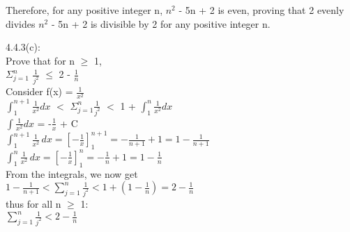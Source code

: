 \documentclass{article}
\begin{document}
	\newline
	Therefore, for any positive integer n, $n^2$ - 5n + 2 is even, proving that 2 evenly divides $n^2$ - 5n + 2 
	is divisible by 2 for any positive integer n. \\
	\newline
	\newline
	\newline
	\newline
	\newline
	\newline
	\newline
	\newline
	\newline
	\newline
	\newline
	\newline
	
	4.4.3(c): \\
	Prove that for n $\geq$ 1, \\
	$\Sigma^{n}_{j=1}$ $\frac{1}{j^2}$ $\leq$ 2 - $\frac{1}{n}$\\
	Consider f(x) = $\frac{1}{x^2}$ \\
	$\int_{1}^{n+1} \frac{1}{x^2} dx$ $<$ $\Sigma^{n}_{j=1} \frac{1}{j^2}$ $<$ 1 + $\int_{1}^{n} \frac{1}{x^2} dx$ \\
	$\int \frac{1}{x^2} dx$ = -$\frac{1}{x}$ + C \\
	$\int_{1}^{n+1} \frac{1}{x^2} \, dx = \left[ -\frac{1}{x} \right]_{1}^{n+1} = -\frac{1}{n+1} + 1 = 1 - \frac{1}{n+1}$ \\
	$\int_{1}^{n} \frac{1}{x^2} \, dx = \left[ -\frac{1}{x} \right]_{1}^{n} = -\frac{1}{n} + 1 = 1 - \frac{1}{n}$ \\
	\newline
	From the integrals, we now get \\
	$1 - \frac{1}{n+1} < \sum_{j=1}^{n} \frac{1}{j^2} < 1 + \left( 1 - \frac{1}{n} \right) = 2 - \frac{1}{n}$ \\
	\newline
	thus for all n $\geq$ 1:\\
	$\sum_{j=1}^{n} \frac{1}{j^2} < 2 - \frac{1}{n}$ \\
\end{document}
